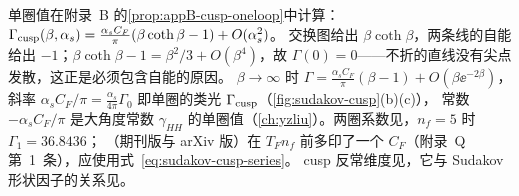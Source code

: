 单圈值在附录~B 的\cref{prop:appB-cusp-oneloop}中计算：$\Gamma_{\rm cusp}(\beta,\alpha_s)=\frac{\alpha_sC_F}{\pi}(\beta\coth\beta-1)+O(\alpha_s^2)$。%
交换图给出 $\beta\coth\beta$，两条线的自能给出 $-1$；$\beta\coth\beta-1=\beta^2/3+O(\beta^4)$，故 $\Gamma(0)=0$——不折的直线没有尖点发散，这正是必须包含自能的原因。
$\beta\to\infty$ 时 $\Gamma=\frac{\alpha_sC_F}\pi(\beta-1)+O(\beta\ee^{-2\beta})$，斜率 $\alpha_sC_F/\pi=\frac{\alpha_s}{4\pi}\Gamma_0$ 即单圈的类光 $\Gamma_{\rm cusp}$（\cref{fig:sudakov-cusp}(b)(c)），
常数 $-\alpha_sC_F/\pi$ 是大角度常数 $\gamma_{HH}$ 的单圈值（\cref{ch:yzliu}）。两圈系数见\cite{KorchemskyRadyushkin1987}，$n_f=5$ 时 $\Gamma_1=36.8436$；
\cite[式~(A.10)]{BecherSchwartz2008}（期刊版与 arXiv 版）在 $T_Fn_f$ 前多印了一个 $C_F$（附录~Q 第~1~条），应使用式~\eqref{eq:sudakov-cusp-series}。
cusp 反常维度见\cite{Polyakov1980,BrandtNeriSato1981,KorchemskyRadyushkin1987}，它与 Sudakov 形状因子的关系见\cite{Korchemsky1989}。

